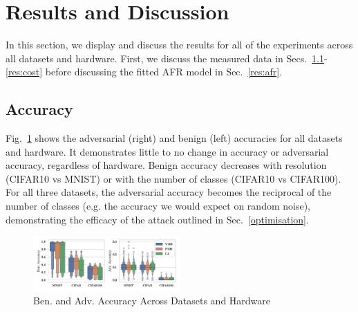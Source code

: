 \documentclass[conference]{IEEEtran}
\begin{document}
\section{Results and Discussion}
\label{results}

In this section, we display and discuss the results for all of the experiments across all datasets and hardware. First, we discuss the measured data in Secs.~\ref{res:acc}-\ref{res:cost} before discussing the fitted AFR model in Sec.~\ref{res:afr}.

\subsection{Accuracy}
\label{res:acc}
Fig.~\ref{fig:acc} shows the adversarial (right) and benign (left) accuracies for all datasets and hardware. It demonstrates little to no change in accuracy or adversarial accuracy, regardless of hardware. Benign accuracy decreases with resolution (CIFAR10 vs MNIST) or with the number of classes (CIFAR10 vs CIFAR100). For all three datasets, the adversarial accuracy becomes the reciprocal of the number of classes (e.g. the accuracy we would expect on random noise), demonstrating the efficacy of the attack outlined in Sec.~\ref{optimisation}.

\begin{figure}[h!]
    \centering
    \includegraphics[width=0.5\textwidth,clip]{plots/combined/acc.pdf}
    \caption{Ben. and Adv. Accuracy Across Datasets and Hardware}
    \label{fig:acc}
\end{figure}
\end{document}
